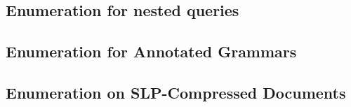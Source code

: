 \documentclass[pdftex]{pucthesis}	%
\begin{document}


\subsection{Enumeration for nested queries}



\subsection{Enumeration for Annotated Grammars}



\subsection{Enumeration on SLP-Compressed Documents}



%


\cleardoublepage
{} \label{references}

\renewcommand{\bibname}{REFERENCES}





%


%
%
%
%
%
%
\end{document}
